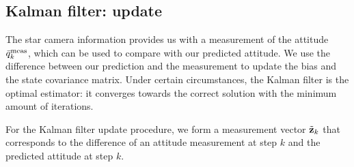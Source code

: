 \subsection{Kalman filter: update}

The star camera information provides us with a measurement of the attitude $\bar{q}^{\textrm{meas}}_{k}$, which can be used to compare with our predicted attitude. We use the difference between our prediction and the measurement to update the bias and the state covariance matrix. Under certain circumstances, the Kalman filter is the optimal estimator: it converges towards the correct solution with the minimum amount of iterations.

For the Kalman filter update procedure, we form a measurement vector $\tilde{\textrm{\textbf{z}}}_{k}$ that corresponds to the difference of an attitude measurement at step $k$ and the predicted attitude at step $k$.


